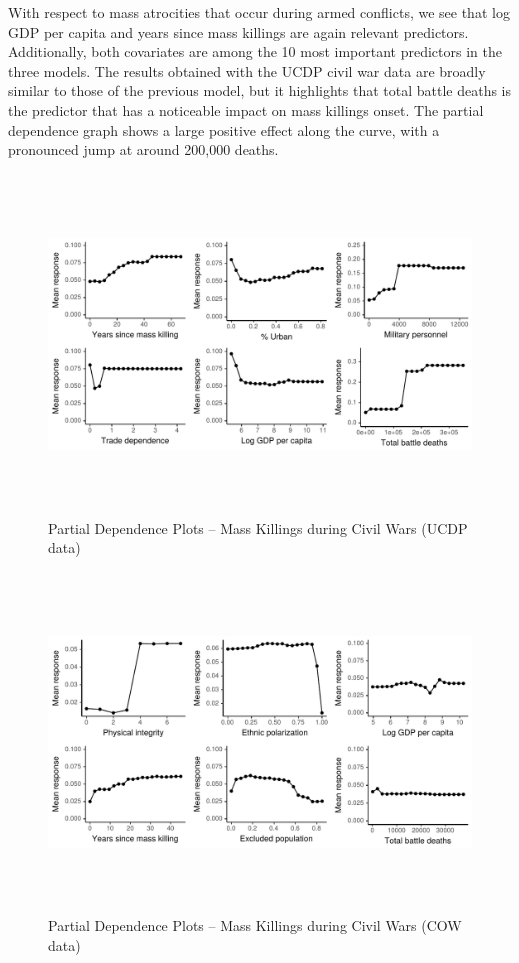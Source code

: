 With respect to mass atrocities that occur during armed conflicts, we see that log GDP per capita and years since mass killings are again relevant predictors. Additionally, both covariates are among the 10 most important predictors in the three models. The results obtained with the UCDP civil war data are broadly similar to those of the previous model, but it highlights that total battle deaths is the predictor that has a noticeable impact on mass killings onset. The partial dependence graph shows a large positive effect along the curve, with a pronounced jump at around 200,000 deaths. 

\vspace{1cm}

\begin{figure}[h!]
\begin{center}
\includegraphics[width=\textwidth, height=9cm]{images/drfdpp2.pdf}
\caption{Partial Dependence Plots -- Mass Killings during Civil Wars (UCDP data)}
\label{fig:drfdpp2}
\end{center}
\end{figure}


\begin{figure}[h!]
\begin{center}
\includegraphics[width=\textwidth, height=9cm]{images/drfdpp3.pdf}
\caption{Partial Dependence Plots -- Mass Killings during Civil Wars (COW data)}
\label{fig:drfdpp3}
\end{center}
\end{figure}


